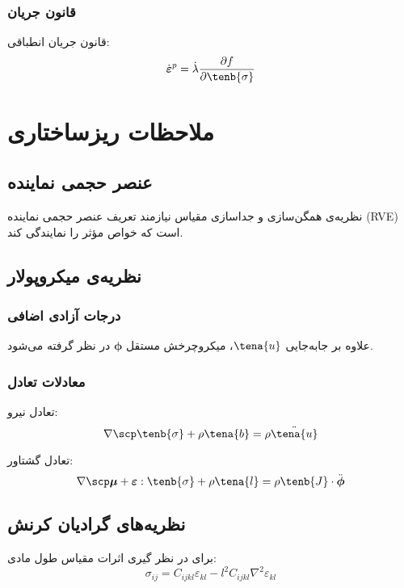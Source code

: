 \subsubsection{قانون جریان}
قانون جریان انطباقی:
\begin{equation}
	\dot{\boldsymbol{\varepsilon}}^p = \dot{\lambda} \frac{\partial f}{\partial \tenb{\sigma}}
\end{equation}

\section{ملاحظات ریزساختاری}

\subsection{عنصر حجمی نماینده}

نظریه‌ی همگن‌سازی و جداسازی مقیاس نیازمند تعریف عنصر حجمی نماینده (RVE) است که خواص مؤثر را نمایندگی کند.

\subsection{نظریه‌ی میکروپولار}

\subsubsection{درجات آزادی اضافی}
علاوه بر جابه‌جایی $\tena{u}$، میکروچرخش مستقل $\boldsymbol{\phi}$ در نظر گرفته می‌شود.

\subsubsection{معادلات تعادل}
تعادل نیرو:
\begin{equation}
	\nabla \scp \tenb{\sigma} + \rho \tena{b} = \rho \ddot{\tena{u}}
\end{equation}

تعادل گشتاور:
\begin{equation}
	\nabla \scp \boldsymbol{\mu} + \boldsymbol{\varepsilon} : \tenb{\sigma} + \rho \tena{l} = \rho \tenb{J} \cdot \ddot{\boldsymbol{\phi}}
\end{equation}

\subsection{نظریه‌های گرادیان کرنش}

برای در نظر گیری اثرات مقیاس طول مادی:
\begin{equation}
	\sigma_{ij} = C_{ijkl} \varepsilon_{kl} - l^2 C_{ijkl} \nabla^2 \varepsilon_{kl}
\end{equation}

